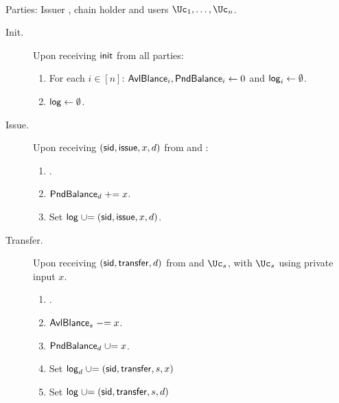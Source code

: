 \begin{functionality}\label{func:ConfidentialTransactions}~
	
	\item[Parties:]	Issuer \Ic, chain holder  \Cc and users  $\Uc_1, \ldots,\Uc_n$.
	
	\begin{description}
		\item[Init.] Upon receiving $\mathsf{init}$ from  all parties: 
		\begin{enumerate}
			\item  For each $i\in [n]$:  $\mathsf{AvlBlance}_i,\mathsf{PndBalance}_i \leftarrow 0$ and  $\mathsf{log}_i \leftarrow \emptyset$.
			
			\item  $\mathsf{log} \leftarrow \emptyset$.
		\end{enumerate}
		
			\item[Issue.]   Upon receiving $(\mathsf{sid},\mathsf{issue},x,d)$ from  \Cc and \Ic:
		\begin{enumerate}
			
			
			\item {}.
			
			\item $\mathsf{PndBalance}_d \mathrel{+}= x$.
			
			\item Set $\mathsf{log} \mathrel{\cup}= {(\mathsf{sid},\mathsf{issue},x,d)}$.
		\end{enumerate}
		
		
		\item[Transfer.]    Upon receiving  $(\mathsf{sid},\mathsf{transfer},d)$ from  \Cc and  $\Uc_s$, with  $\Uc_s$ using private input $x$. 
		
	
		\begin{enumerate}
			\item {}.
			
			\item $\mathsf{AvlBlance}_s \mathrel{-}= x$.
			
			\item   $\mathsf{PndBalance}_d \mathrel{\cup}= x$.
			
			\item Set $\mathsf{log}_d \mathrel{\cup}= {(\mathsf{sid},\mathsf{transfer},s,x)}$
			
			\item Set $\mathsf{log} \mathrel{\cup}= {(\mathsf{sid},\mathsf{transfer},s,d)}$
			
		\end{enumerate}
		

\end{description}
\end{functionality}
